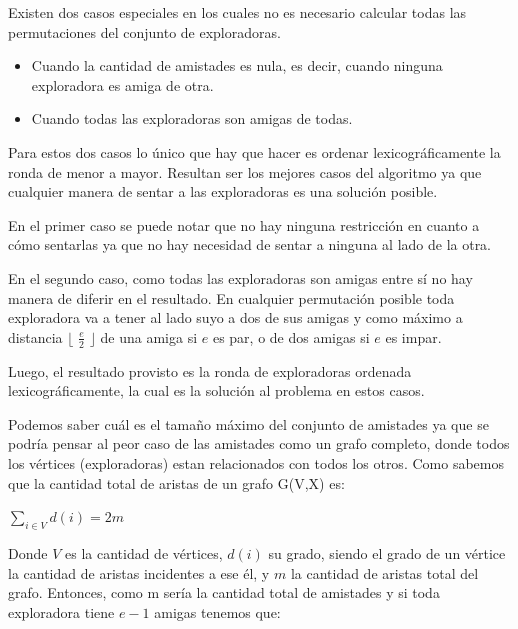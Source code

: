 \documentclass[spanish,a4paper]{article}
\begin{document}
Existen dos casos especiales en los cuales no es necesario calcular todas las permutaciones del conjunto de exploradoras.
\begin{itemize}
  \item Cuando la cantidad de amistades es nula, es decir, cuando ninguna exploradora es amiga de otra.
  \item Cuando todas las exploradoras son amigas de todas.
\end{itemize}
Para estos dos casos lo único que hay que hacer es ordenar lexicográficamente la ronda de menor a mayor. 
Resultan ser los mejores casos del algoritmo ya que cualquier manera de sentar a las exploradoras 
es una solución posible.

En el primer caso se puede notar que no hay ninguna restricción en cuanto a cómo sentarlas 
ya que no hay necesidad de sentar a ninguna al lado de la otra.

En el segundo caso, como todas las exploradoras 
son amigas entre sí no hay manera de diferir en el resultado. En cualquier permutación posible toda exploradora va a tener al lado suyo 
a dos de sus amigas y como máximo a distancia $\lfloor$ $\frac{e}{2}$ $\rfloor$ de una amiga si $e$ es par, o de 
dos amigas si $e$ es impar. 

Luego, el resultado provisto es la ronda de exploradoras ordenada lexicográficamente, la cual es la solución 
al problema en estos casos.

Podemos saber cuál es el tamaño máximo del conjunto de amistades ya que 
se podría pensar al peor caso de las amistades como un grafo completo, donde todos los vértices (exploradoras) estan
relacionados con todos los otros. Como sabemos que la cantidad total de aristas de un grafo G(V,X) es:

\vspace{3mm}

\begin{center}
$\sum\nolimits_{i \in V}d(i) = 2m$ 
\end{center}

\vspace{3mm}

Donde $V$ es la cantidad de vértices, $d(i)$ su grado, siendo el grado de un vértice la 
cantidad de aristas incidentes a ese él, y $m$ la cantidad de aristas total del grafo. Entonces, como
m sería la cantidad total de amistades y si toda exploradora tiene $e-1$ amigas tenemos que:

\vspace{3mm}
\end{document}
